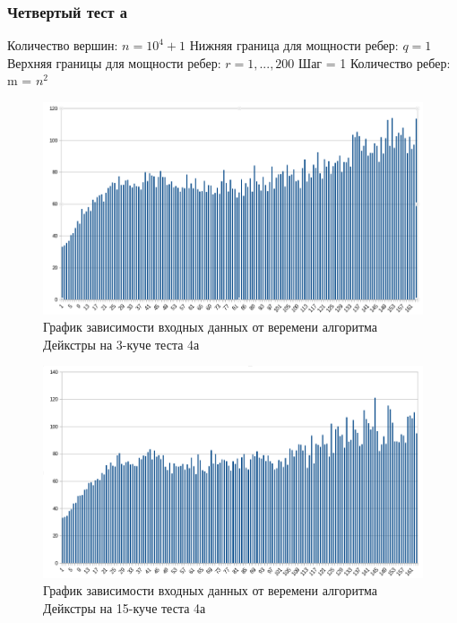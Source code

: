\documentclass[a4paper, 12pt]{article}
\theoremstyle{definition}
\begin{document}
	\newpage
	
	\subsubsection{Четвертый тест а}
	
	Количество вершин: $n = 10^4+1$ \newline
	Нижняя граница для мощности ребер: $q = 1$ \newline
	Верхняя границы для мощности ребер: $r = 1,...,200$ \newline
	Шаг = 1 \newline
	Количество ребер: m = $n^2$ \newline
	
	\begin{figure}[!ht]
		\centering
		\includegraphics[width=1\textwidth]{img/res4a_3.png}
		\caption{График зависимости входных данных от веремени алгоритма Дейкстры на 3-куче теста 4а}
		\label{fig:my_image}
	\end{figure}
	
	\begin{figure}[!ht]
		\centering
		\includegraphics[width=1\textwidth]{img/res4a_15.png}
		\caption{График зависимости входных данных от веремени алгоритма Дейкстры на 15-куче теста 4а}
		\label{fig:my_image}
	\end{figure}
	\newpage
	
\end{document}
